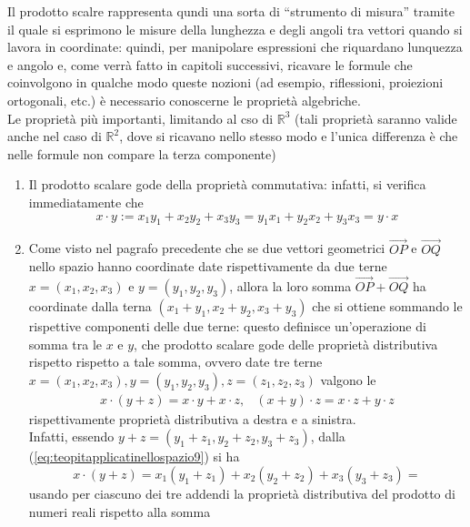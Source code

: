 Il prodotto scalre rappresenta qundi una sorta di ``strumento di misura'' tramite il quale si esprimono le misure della lunghezza e degli angoli tra vettori quando si lavora in coordinate: quindi, per manipolare espressioni che riquardano lunquezza e angolo e, come verrà fatto in capitoli successivi, ricavare le formule che coinvolgono in qualche modo queste nozioni (ad esempio, riflessioni, proiezioni ortogonali, etc.) è necessario conoscerne le proprietà algebriche.\\
Le proprietà più importanti, limitando al cso di $\mathds{R}^3$ (tali proprietà saranno valide anche nel caso di $\mathds{R}^2$, dove si ricavano nello stesso modo e l'unica differenza è che nelle formule non compare la terza componente)
\begin{enumerate}
\item Il prodotto scalare gode della proprietà commutativa: infatti, si verifica immediatamente che
  \begin{equation*}
    x\cdot y:=x_1y_1+x_2y_2+x_3y_3=y_1x_1+y_2x_2+y_3x_3=y\cdot x
  \end{equation*}
\item Come visto nel pagrafo precedente che se due vettori geometrici $\vec{OP}$ e $\vec{OQ}$ nello spazio hanno coordinate date rispettivamente da due terne $x=(x_1,x_2,x_3)$ e $y=(y_1,y_2,y_3)$, allora la loro somma $\vec{OP}+\vec{OQ}$ ha coordinate dalla terna $(x_1+y_1,x_2+y_2,x_3+y_3)$ che si ottiene sommando le rispettive componenti delle due terne: questo definisce un'operazione di somma tra le $x$ e $y$, che prodotto scalare gode delle proprietà distributiva rispetto rispetto a tale somma, ovvero date tre terne $x=(x_1,x_2,x_3),y=(y_1,y_2,y_3),z=(z_1,z_2,z_3)$ valgono le
  \begin{eqnarray}
    \label{eq:teopitapplicatinellospazio10}
    x\cdot (y+z)=x\cdot y+x\cdot z, & (x+y)\cdot z=x\cdot z+y\cdot z
  \end{eqnarray}
  rispettivamente proprietà distributiva a destra e a sinistra.\\
  Infatti, essendo $y+z=(y_1+z_1,y_2+z_2, y_3+z_3)$, dalla (\ref{eq:teopitapplicatinellospazio9}) si ha
  \begin{equation*}
    x\cdot (y+z)=x_1(y_1+z_1)+x_2(y_2+z_2)+x_3(y_3+z_3)=
  \end{equation*}
  usando per ciascuno dei tre addendi la proprietà distributiva del prodotto di numeri reali rispetto alla somma
  \begin{equation*}
    \begin{matrix}

\end{matrix}
\end{equation*}
\end{enumerate}
